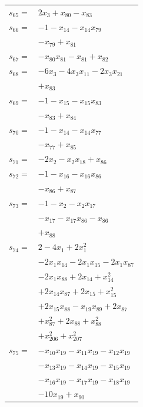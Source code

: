 \begin{longtable}{@{}r@{\;}l@{}}
\(s_{65}=\) & \(\displaystyle 2x_{3} +x_{80} -x_{83}\) \\[3pt]
\(s_{66}=\) & \(\displaystyle -1 -x_{14} -x_{14}x_{79}\) \\
 & \(\displaystyle -x_{79} +x_{81}\) \\[3pt]
\(s_{67}=\) & \(\displaystyle -x_{80}x_{81} -x_{81} +x_{82}\) \\[3pt]
\(s_{68}=\) & \(\displaystyle -6x_{3} -4x_{3}x_{11} -2x_{3}x_{21}\) \\
 & \(\displaystyle +x_{83}\) \\[3pt]
\(s_{69}=\) & \(\displaystyle -1 -x_{15} -x_{15}x_{83}\) \\
 & \(\displaystyle -x_{83} +x_{84}\) \\[3pt]
\(s_{70}=\) & \(\displaystyle -1 -x_{14} -x_{14}x_{77}\) \\
 & \(\displaystyle -x_{77} +x_{85}\) \\[3pt]
\(s_{71}=\) & \(\displaystyle -2x_{2} -x_{2}x_{18} +x_{86}\) \\[3pt]
\(s_{72}=\) & \(\displaystyle -1 -x_{16} -x_{16}x_{86}\) \\
 & \(\displaystyle -x_{86} +x_{87}\) \\[3pt]
\(s_{73}=\) & \(\displaystyle -1 -x_{2} -x_{2}x_{17}\) \\
 & \(\displaystyle -x_{17} -x_{17}x_{86} -x_{86}\) \\
 & \(\displaystyle +x_{88}\) \\[3pt]
\(s_{74}=\) & \(\displaystyle 2 -4x_{1} +2x_{1}^{2}\) \\
 & \(\displaystyle -2x_{1}x_{14} -2x_{1}x_{15} -2x_{1}x_{87}\) \\
 & \(\displaystyle -2x_{1}x_{88} +2x_{14} +x_{14}^{2}\) \\
 & \(\displaystyle +2x_{14}x_{87} +2x_{15} +x_{15}^{2}\) \\
 & \(\displaystyle +2x_{15}x_{88} -x_{19}x_{89} +2x_{87}\) \\
 & \(\displaystyle +x_{87}^{2} +2x_{88} +x_{88}^{2}\) \\
 & \(\displaystyle +x_{206}^{2} +x_{207}^{2}\) \\[3pt]
\(s_{75}=\) & \(\displaystyle -x_{10}x_{19} -x_{11}x_{19} -x_{12}x_{19}\) \\
 & \(\displaystyle -x_{13}x_{19} -x_{14}x_{19} -x_{15}x_{19}\) \\
 & \(\displaystyle -x_{16}x_{19} -x_{17}x_{19} -x_{18}x_{19}\) \\
 & \(\displaystyle -10x_{19} +x_{90}\) \\[3pt]

\end{longtable}
